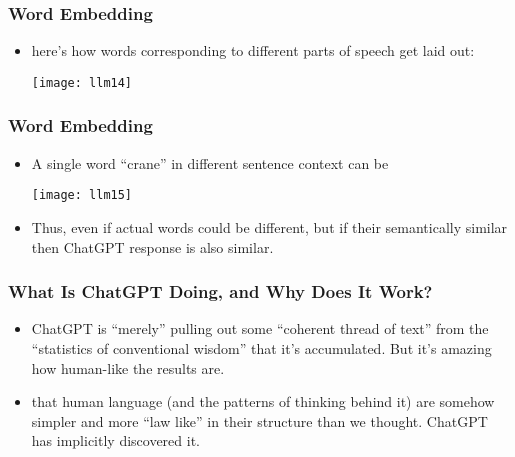 \begin{frame}[fragile]\frametitle{Word Embedding}

\begin{itemize}

\item here’s how words corresponding to different parts of speech get laid out:

\begin{center}
\texttt{[image: llm14]}
\end{center}

\end{itemize}

\end{frame}



\begin{frame}[fragile]\frametitle{Word Embedding}

\begin{itemize}

\item A single word ``crane'' in different sentence context can be 

\begin{center}
\texttt{[image: llm15]}
\end{center}

\item Thus, even if actual words could be different, but if their semantically similar then ChatGPT response is also similar.
\end{itemize}

\end{frame}

\begin{frame}[fragile]\frametitle{What Is ChatGPT Doing, and Why Does It Work?}

\begin{itemize}
\item ChatGPT is “merely” pulling out some “coherent thread of text” from the “statistics of conventional wisdom” that it’s accumulated. But it’s amazing how human-like the results are.
\item that human language (and the patterns of thinking behind it) are somehow simpler and more “law like” in their structure than we thought. ChatGPT has implicitly discovered it.
\end{itemize}

\end{frame}

